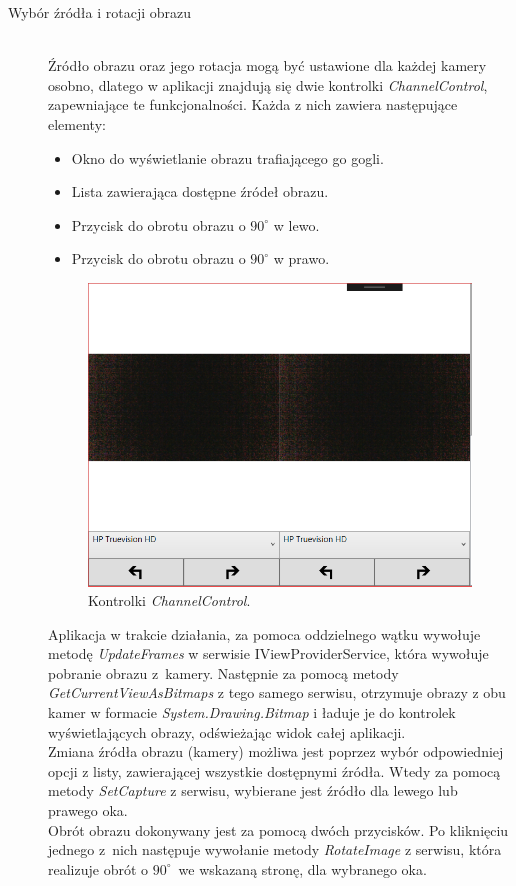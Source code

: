 \documentclass[a4paper,11pt,twoside]{report}
\theoremstyle{definition}
\begin{document}
\begin{description}
\item [Wybór źródła i rotacji obrazu] \hfill \\

Źródło obrazu oraz jego rotacja mogą być ustawione dla każdej kamery osobno, dlatego w aplikacji znajdują się dwie kontrolki \textit{ChannelControl}, zapewniające te funkcjonalności. Każda z nich zawiera następujące elementy:

\begin{itemize}
\item Okno do wyświetlanie obrazu trafiającego go gogli.
\item Lista zawierająca dostępne źródeł obrazu.
\item Przycisk do obrotu obrazu o $90^\circ$ w lewo.
\item Przycisk do obrotu obrazu o $90^\circ$ w prawo.
\end{itemize}

\begin{figure}[H]
\centering
\includegraphics[scale=0.5]{images/channelcontrol_screen}
\caption[Widok aplikacji]{Kontrolki \textit{ChannelControl}.}
\end{figure}

Aplikacja w trakcie działania, za pomoca oddzielnego wątku wywołuje metodę \textit{UpdateFrames} w serwisie {IViewProviderService}, która wywołuje pobranie obrazu z~kamery. Następnie za pomocą metody \textit{GetCurrentViewAsBitmaps} z tego samego serwisu, otrzymuje obrazy z obu kamer w formacie \textit{System.Drawing.Bitmap} i ładuje je do kontrolek wyświetlających obrazy, odświeżając widok całej aplikacji. \\
Zmiana źródła obrazu (kamery) możliwa jest poprzez wybór odpowiedniej opcji z listy, zawierającej wszystkie dostępnymi źródła. Wtedy za pomocą metody \textit{SetCapture} z serwisu, wybierane jest źródło dla lewego lub prawego oka. \\
Obrót obrazu dokonywany jest za pomocą dwóch przycisków. Po kliknięciu jednego z~nich następuje wywołanie metody \textit{RotateImage} z serwisu, która realizuje obrót o $90^\circ$~we wskazaną stronę, dla wybranego oka.


\end{description}
\end{document}
